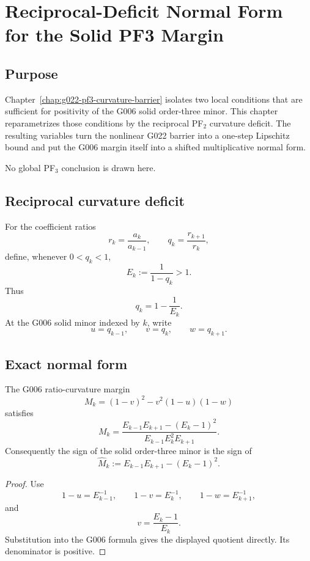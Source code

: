 \chapter{Reciprocal-Deficit Normal Form for the Solid PF3 Margin}
\label{chap:g023-reciprocal-deficit}


\section{Purpose}

Chapter~\ref{chap:g022-pf3-curvature-barrier} isolates two local conditions
that are sufficient for positivity of the G006 solid order-three minor. This
chapter reparametrizes those conditions by the reciprocal PF$_2$ curvature
deficit. The resulting variables turn the nonlinear G022 barrier into a
one-step Lipschitz bound and put the G006 margin itself into a shifted
multiplicative normal form.

No global PF$_3$ conclusion is drawn here.

\section{Reciprocal curvature deficit}

For the coefficient ratios
\[
 r_k=\frac{a_k}{a_{k-1}},
 \qquad
 q_k=\frac{r_{k+1}}{r_k},
\]
define, whenever $0<q_k<1$,
\[
 \boxed{
 E_k:=\frac{1}{1-q_k}>1.
 }
\]
Thus
\[
 q_k=1-\frac1{E_k}.
\]
At the G006 solid minor indexed by $k$, write
\[
 u=q_{k-1},\qquad v=q_k,\qquad w=q_{k+1}.
\]

\section{Exact normal form}

\begin{theorem}
The G006 ratio-curvature margin
\[
 M_k=(1-v)^2-v^2(1-u)(1-w)
\]
satisfies
\[
 \boxed{
 M_k=
 \frac{E_{k-1}E_{k+1}-(E_k-1)^2}
      {E_{k-1}E_k^2E_{k+1}}.
 }
\]
Consequently the sign of the solid order-three minor is the sign of
\[
 \boxed{
 \widehat M_k:=E_{k-1}E_{k+1}-(E_k-1)^2.
 }
\]
\end{theorem}

\begin{proof}
Use
\[
 1-u=E_{k-1}^{-1},
 \qquad
 1-v=E_k^{-1},
 \qquad
 1-w=E_{k+1}^{-1},
\]
and
\[
 v=\frac{E_k-1}{E_k}.
\]
Substitution into the G006 formula gives the displayed quotient directly. Its
denominator is positive.
\end{proof}


